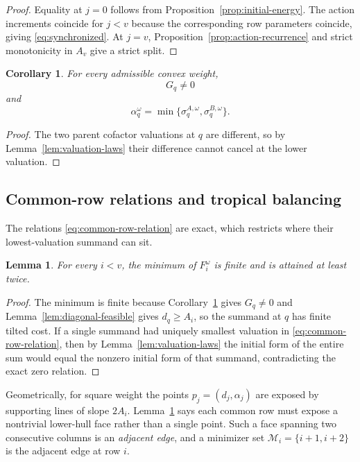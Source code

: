 \documentclass[11pt,a4paper]{amsart}
\numberwithin{equation}{section}
\theoremstyle{plain}
\newtheorem{lemma}[theorem]{Lemma}
\newtheorem{corollary}[theorem]{Corollary}
\theoremstyle{definition}
\begin{document}
\begin{proof}
Equality at \(j=0\) follows from Proposition~\ref{prop:initial-energy}.  The action increments coincide for \(j<v\) because the corresponding row parameters coincide, giving \eqref{eq:synchronized}.  At \(j=v\), Proposition~\ref{prop:action-recurrence} and strict monotonicity in \(A_v\) give a strict split.
\end{proof}

\begin{corollary}\label{cor:first-split-anchor}
For every admissible convex weight,
\[
G_q\ne0
\]
and
\[
\alpha_q^\omega
=
\min\{\sigma_q^{A,\omega},\sigma_q^{B,\omega}\}.
\]
\end{corollary}

\begin{proof}
The two parent cofactor valuations at \(q\) are different, so by Lemma~\ref{lem:valuation-laws} their difference cannot cancel at the lower valuation.
\end{proof}

\subsection{Common-row relations and tropical balancing}\label{subsec:balancing}

The relations \eqref{eq:common-row-relation} are exact, which restricts where their lowest-valuation summand can sit.

\begin{lemma}\label{lem:tropical-balancing}
For every \(i<v\), the minimum of \(F_i^\omega\) is finite and is attained at least twice.
\end{lemma}

\begin{proof}
The minimum is finite because Corollary~\ref{cor:first-split-anchor} gives \(G_q\ne0\) and Lemma~\ref{lem:diagonal-feasible} gives \(d_q\ge A_i\), so the summand at \(q\) has finite tilted cost.  If a single summand had uniquely smallest valuation in \eqref{eq:common-row-relation}, then by Lemma~\ref{lem:valuation-laws} the initial form of the entire sum would equal the nonzero initial form of that summand, contradicting the exact zero relation.
\end{proof}

Geometrically, for square weight the points \(p_j=(d_j,\alpha_j)\) are exposed by supporting lines of slope \(2A_i\).  Lemma~\ref{lem:tropical-balancing} says each common row must expose a nontrivial lower-hull face rather than a single point.  Such a face spanning two consecutive columns is an \emph{adjacent edge}, and a minimizer set \(\mathcal M_i=\{i+1,i+2\}\) is the adjacent edge at row \(i\).
\end{document}
